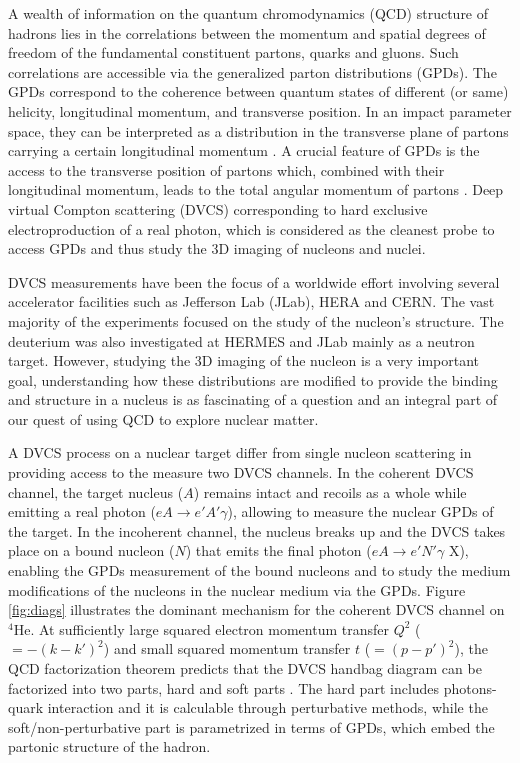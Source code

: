 \documentclass[nofootinbib,twocolumn,showpacs,prl,superscriptaddress,secnumarabic,amssymb,nobibnotes,aps,floatfix]{revtex4}
\begin{document}
A wealth of information on the quantum chromodynamics (QCD) structure of 
hadrons lies in the correlations between the momentum and spatial degrees of 
freedom of the fundamental constituent partons, quarks and gluons. Such 
correlations are accessible via the generalized parton distributions (GPDs).  
The GPDs correspond to the coherence between quantum states of different (or 
same) helicity, longitudinal momentum, and transverse position. In an impact 
parameter space, they can be interpreted as a distribution in the transverse 
plane of partons carrying a certain longitudinal momentum 
\cite{Burkardt:2000za,Diehl:2002he,Belitsky:2002ep}. A crucial feature of GPDs 
is the access to the transverse position of partons which, combined with their 
longitudinal momentum, leads to the total angular momentum of partons 
\cite{Burkardt:2005hp}. Deep virtual Compton scattering (DVCS) corresponding to 
hard exclusive electroproduction of a real photon, which is considered as the 
cleanest probe to access GPDs and thus study the 3D imaging of nucleons and 
nuclei.

DVCS measurements have been the focus of a worldwide effort 
\cite{Stepanyan:2001sm,Airapetian,Chekanov:2003ya,Aktas:2005ty,Chen:2006na,Munoz 
Camacho:2006hx,Girod:2007aa,Gavalian:2009,Seder:2015,Pisano:2015,Jo:2015ema} 
involving several accelerator facilities such as Jefferson Lab (JLab), HERA and  
CERN. The vast majority of the experiments focused on the study of the 
nucleon's structure. The deuterium was also investigated at HERMES and JLab 
\cite{Mazouz:2007aa} mainly as a neutron target. However, studying the 3D 
imaging of the nucleon is a very important goal, understanding how these 
distributions are modified to provide the binding and structure in a nucleus is 
as fascinating of a question and an integral part of our quest of using QCD to 
explore nuclear matter. 

A DVCS process on a nuclear target differ from single nucleon scattering in 
providing access to the measure two DVCS channels. In the coherent DVCS 
channel, the target nucleus ($A$) remains intact and recoils as a whole while 
emitting a real photon ($eA \rightarrow e' A' \gamma$), allowing to measure the 
nuclear GPDs of the target. In the incoherent channel, the nucleus breaks up 
and the DVCS takes place on a bound nucleon ($N$) that emits the final photon 
($eA \rightarrow e' N' \gamma$ X), enabling the GPDs measurement of the bound 
nucleons and to study the medium modifications of the nucleons in the nuclear 
medium via the GPDs.  Figure \ref{fig:diags} illustrates the dominant mechanism 
for the coherent DVCS channel on $^4$He. At sufficiently large squared electron 
momentum transfer $Q^2$ ($= -(k-k')^{2}$) and small squared momentum transfer 
$t$ ($= (p-p')^{2}$), the QCD factorization theorem predicts that the DVCS 
handbag diagram can be factorized into two parts, hard and soft parts 
\cite{Freund_Collins,Ji_Osborne}. The hard part includes photons-quark 
interaction and it is calculable through perturbative methods, while the 
soft/non-perturbative part is parametrized in terms of GPDs, which embed the 
partonic structure of the hadron.  
\end{document}
